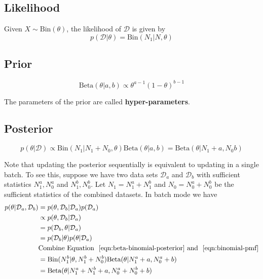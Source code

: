 \subsection{Likelihood}
Given $X \sim \text{Bin}(\theta)$, the likelihood of $\mathcal{D}$ is given by
\begin{equation}
p(\mathcal{D}|\theta)= \text{Bin}(N_1|N,\theta)
\end{equation}


\subsection{Prior}
\begin{equation}
\text{Beta}(\theta|a,b) \propto \theta^{a-1}(1-\theta)^{b-1}
\end{equation}

The parameters of the prior are called \textbf{hyper-parameters}.


\subsection{Posterior}
\begin{equation}\label{eqn:beta-binomial-posterior}
p(\theta|\mathcal{D}) \propto \text{Bin}(N_1|N_1+N_0,\theta)\text{Beta}(\theta|a,b)=\text{Beta}(\theta|N_1+a,N_0b)
\end{equation}

Note that updating the posterior sequentially is equivalent to updating in a single batch. To see this, suppose we have two data sets $\mathcal{D}_a$ and $\mathcal{D}_b$ with sufficient statistics $N_1^a,N_0^a$ and $N_1^b,N_0^b$. Let $N_1=N_1^a+N_1^b$ and $N_0=N_0^a+N_0^b$ be the sufficient statistics of the combined datasets. In batch mode we have
\begin{align*}
p(\theta|\mathcal{D}_a,\mathcal{D}_b)& = p(\theta,\mathcal{D}_b|\mathcal{D}_a)p(\mathcal{D}_a) \\
               &\propto p(\theta,\mathcal{D}_b|\mathcal{D}_a) \\
               & = p(\mathcal{D}_b,\theta|\mathcal{D}_a) \\
			   & = p(\mathcal{D}_b|\theta)p(\theta|\mathcal{D}_a) \\
			   & \text{Combine Equation ~\ref{eqn:beta-binomial-posterior} and ~\ref{eqn:binomial-pmf}} \\
			   & =\text{Bin}(N_1^b|\theta, N_1^b+N_0^b)\text{Beta}(\theta|N_1^a+a,N_0^a+b) \\
			   & =\text{Beta}(\theta|N_1^a+N_1^b+a,N_0^a+N_0^b+b)
\end{align*}

